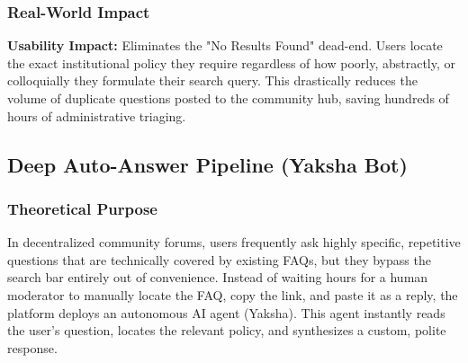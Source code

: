 \documentclass[12pt,a4paper]{article}
\begin{document}
\vspace{0.5cm}
\begin{center}
\end{center}

\subsubsection{Real-World Impact}
\textbf{Usability Impact:} Eliminates the "No Results Found" dead-end. Users locate the exact institutional policy they require regardless of how poorly, abstractly, or colloquially they formulate their search query. This drastically reduces the volume of duplicate questions posted to the community hub, saving hundreds of hours of administrative triaging.

\newpage

\subsection{Deep Auto-Answer Pipeline (Yaksha Bot)}

\subsubsection{Theoretical Purpose}
In decentralized community forums, users frequently ask highly specific, repetitive questions that are technically covered by existing FAQs, but they bypass the search bar entirely out of convenience. Instead of waiting hours for a human moderator to manually locate the FAQ, copy the link, and paste it as a reply, the platform deploys an autonomous AI agent (Yaksha). This agent instantly reads the user's question, locates the relevant policy, and synthesizes a custom, polite response.
\end{document}
